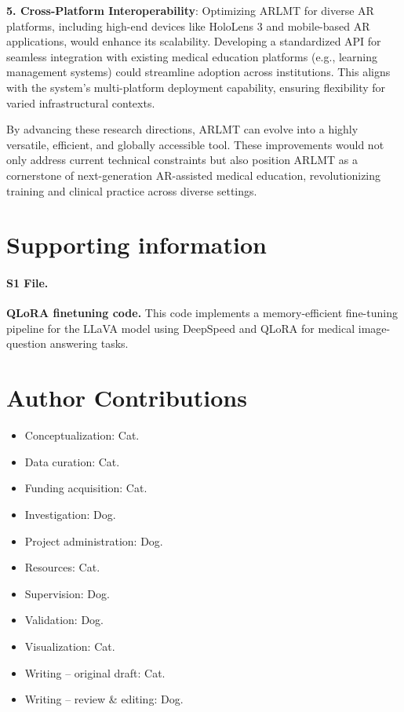 \documentclass[10pt,letterpaper]{article}
\begin{document}
\textbf{5. Cross-Platform Interoperability}: Optimizing ARLMT for diverse AR platforms, including high-end devices like HoloLens 3 and mobile-based AR applications, would enhance its scalability. Developing a standardized API for seamless integration with existing medical education platforms (e.g., learning management systems) could streamline adoption across institutions. This aligns with the system’s multi-platform deployment capability, ensuring flexibility for varied infrastructural contexts.

By advancing these research directions, ARLMT can evolve into a highly versatile, efficient, and globally accessible tool. These improvements would not only address current technical constraints but also position ARLMT as a cornerstone of next-generation AR-assisted medical education, revolutionizing training and clinical practice across diverse settings.


\nolinenumbers

\section*{Supporting information}


\paragraph*{S1 File.}
\label{S1_File}
{\bf QLoRA finetuning code.}  This code implements a memory-efficient fine-tuning pipeline for the LLaVA model using DeepSpeed and QLoRA for medical image-question answering tasks.



\section*{Author Contributions}
\begin{itemize}
\item Conceptualization: Cat.
\item Data curation: Cat.
\item Funding acquisition: Cat.
\item Investigation: Dog.
\item Project administration: Dog.
\item Resources: Cat.
\item Supervision: Dog.
\item Validation: Dog.
\item Visualization: Cat.
\item Writing -- original draft: Cat.
\item Writing -- review \& editing: Dog.
\end{itemize}
\end{document}
